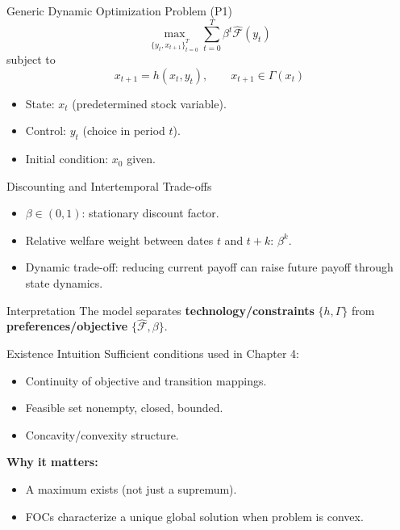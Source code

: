\documentclass[aspectratio=169,10pt]{beamer}
\newcommand{\apxbutton}[1]{\hfill\hyperlink{#1}{\beamerbutton{Appendix}}}
\begin{document}
\begin{frame}{Generic Dynamic Optimization Problem (P1)}
\hypertarget{m-a1}{}
\[
\max_{\{y_t,x_{t+1}\}_{t=0}^{T}} \sum_{t=0}^{T} \beta^t \hat{\mathcal{F}}(y_t)
\]
subject to
\[
x_{t+1}=h(x_t,y_t), \qquad x_{t+1}\in\Gamma(x_t)
\]

\begin{itemize}
  \item State: $x_t$ (predetermined stock variable).
  \item Control: $y_t$ (choice in period $t$).
  \item Initial condition: $x_0$ given.
\end{itemize}
\apxbutton{a1}
\end{frame}

\begin{frame}{Discounting and Intertemporal Trade-offs}
\begin{itemize}
  \item $\beta\in(0,1)$: stationary discount factor.
  \item Relative welfare weight between dates $t$ and $t+k$: $\beta^k$.
  \item Dynamic trade-off: reducing current payoff can raise future payoff through state dynamics.
\end{itemize}

\begin{block}{Interpretation}
The model separates \textbf{technology/constraints} $\{h,\Gamma\}$ from \textbf{preferences/objective} $\{\hat{\mathcal{F}},\beta\}$.
\end{block}
\end{frame}

\begin{frame}{Existence Intuition}
Sufficient conditions used in Chapter 4:
\begin{itemize}
  \item Continuity of objective and transition mappings.
  \item Feasible set nonempty, closed, bounded.
  \item Concavity/convexity structure.
\end{itemize}

\medskip
\textbf{Why it matters:}
\begin{itemize}
  \item A maximum exists (not just a supremum).
  \item FOCs characterize a unique global solution when problem is convex.
\end{itemize}
\end{frame}
\end{document}
